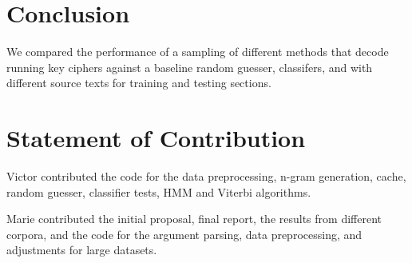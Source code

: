 \documentclass[11pt,letterpaper]{article}
\begin{document}
\section{Conclusion}
We compared the performance of a sampling of different methods that decode running key ciphers against a baseline random guesser, classifers, and with different source texts for training and testing sections. 

\section{Statement of Contribution}
Victor contributed the code for the data preprocessing, n-gram generation, cache, random guesser, classifier tests, HMM and Viterbi algorithms.

Marie contributed the initial proposal, final report, the results from different corpora, and the code for the argument parsing, data preprocessing, and adjustments for large datasets.



\end{document}
